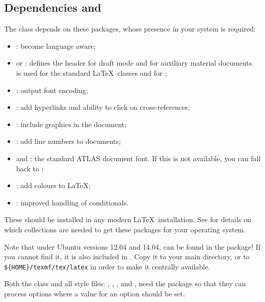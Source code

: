 \subsection{Dependencies and }
\label{sec:atlaspackage}

The  class depends on these packages, whose presence in
your system is required:
\begin{itemize}\setlength{\parskip}{0pt}\setlength{\itemsep}{0pt}
\item {}: become language aware;
\item {} or : defines the header for draft mode
  and for auxiliary material documents.
   is used for the standard \LaTeX\ classes and
   for \KOMAScript;
\item {}: output font encoding;
\item {}: add hyperlinks and ability to click on cross-references;
\item {}: include graphics in the document;
\item {}: add line numbers to documents;
\item {} and : the standard ATLAS document font.
  If this is not available, you can fall back to ;
\item {}: add colours to \LaTeX;
\item {}: improved handling of conditionals.
\end{itemize}
These should be installed in any modern \LaTeX\ installation.
See \cite{latex-faq} for details on which collections are needed to get these packages
for your operating system.

Note that under Ubuntu versions 12.04 and 14.04,  can be found in the
 package!
If you cannot find it, it is also included in .
Copy it to your main directory, or to \verb|${HOME}/texmf/tex/latex| in order to make
it centrally available.

Both the class  and all style files:
, , ,  and ,
need the package  
so that they can process options where a value for an option should be set.


